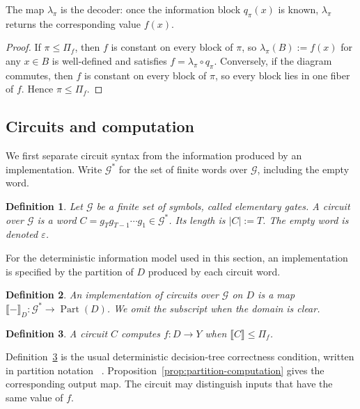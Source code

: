 \documentclass[11pt]{article}
\numberwithin{equation}{section}
\newtheorem{definition}{Definition}[section]
\theoremstyle{remark}
\newcommand{\Part}{\operatorname{Part}}
\begin{document}
The map $\lambda_\pi$ is the decoder: once the information block
$q_\pi(x)$ is known, $\lambda_\pi$ returns the corresponding value $f(x)$.

\begin{proof}
If $\pi\leq\Pi_f$, then $f$ is constant on every block of $\pi$, so
$\lambda_\pi(B):=f(x)$ for any $x\in B$ is well-defined and satisfies
$f=\lambda_\pi\circ q_\pi$.  Conversely, if the diagram commutes, then
$f$ is constant on every block of $\pi$, so every block lies in one fiber
of $f$.  Hence $\pi\leq\Pi_f$.
\end{proof}


\subsection{Circuits and computation}
\label{subsec:circuits-and-computation}

We first separate circuit syntax from the information produced by an
implementation. Write $\mathcal G^*$ for the set of finite words over
$\mathcal G$, including the empty word.

\begin{definition}
\label{def:circuit-word}
Let $\mathcal G$ be a finite set of symbols, called elementary gates. A
\emph{circuit} over $\mathcal G$ is a word
$C=g_Tg_{T-1}\cdots g_1\in\mathcal G^*$.
Its length is $|C|:=T$.  The empty word is denoted $\varepsilon$.
\end{definition}

For the deterministic information model used in this section, an implementation
is specified by the partition of $D$ produced by each circuit word.

\begin{definition}
\label{def:circuit-implementation}
An \emph{implementation} of circuits over $\mathcal G$ on $D$ is a map $\llbracket-\rrbracket_D:\mathcal G^*\to\Part(D)$. We omit the subscript when the domain is clear.
\end{definition}

\begin{definition}
\label{def:circuit-computes}
A circuit $C$ \emph{computes} $f:D\to Y$ when
$\llbracket C\rrbracket\leq\Pi_f$.
\end{definition}

Definition~\ref{def:circuit-computes} is the usual deterministic
decision-tree correctness condition, written in partition notation
~\cite{BuhrmanDeWolf2002,KothariRacicotDeslogesSantha2015}.
Proposition~\ref{prop:partition-computation} gives the corresponding output
map. The circuit may distinguish inputs that have the same value of $f$.
\end{document}
